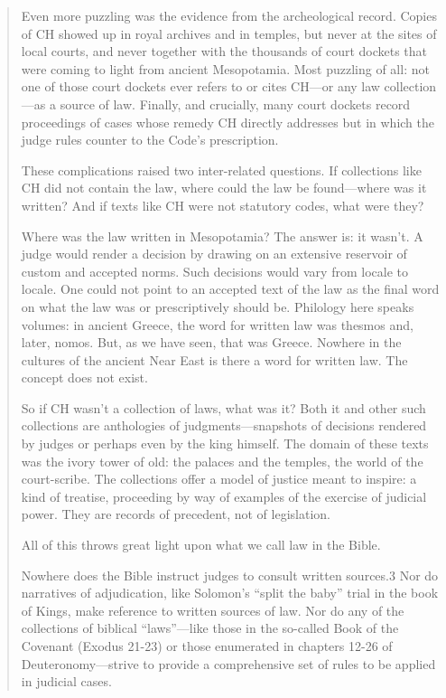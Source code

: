 \documentclass[11pt]{article}
\begin{document}
\begin{quote}
Even more puzzling was the evidence from the archeological record. Copies of CH showed up in royal archives and in temples, but never at the sites of local courts, and never together with the thousands of court dockets that were coming to light from ancient Mesopotamia. Most puzzling of all: not one of those court dockets ever refers to or cites CH—or any law collection—as a source of law. Finally, and crucially, many court dockets record proceedings of cases whose remedy CH directly addresses but in which the judge rules counter to the Code’s prescription.

These complications raised two inter-related questions. If collections like CH did not contain the law, where could the law be found—where was it written? And if texts like CH were not statutory codes, what were they?

Where was the law written in Mesopotamia? The answer is: it wasn’t. A judge would render a decision by drawing on an extensive reservoir of custom and accepted norms. Such decisions would vary from locale to locale. One could not point to an accepted text of the law as the final word on what the law was or prescriptively should be. Philology here speaks volumes: in ancient Greece, the word for written law was thesmos and, later, nomos. But, as we have seen, that was Greece. Nowhere in the cultures of the ancient Near East is there a word for written law. The concept does not exist. 

So if CH wasn’t a collection of laws, what was it? Both it and other such collections are anthologies of judgments—snapshots of decisions rendered by judges or perhaps even by the king himself. The domain of these texts was the ivory tower of old: the palaces and the temples, the world of the court-scribe. The collections offer a model of justice meant to inspire: a kind of treatise, proceeding by way of examples of the exercise of judicial power. They are records of precedent, not of legislation.


All of this throws great light upon what we call law in the Bible.

Nowhere does the Bible instruct judges to consult written sources.3 Nor do narratives of adjudication, like Solomon’s “split the baby” trial in the book of Kings, make reference to written sources of law. Nor do any of the collections of biblical “laws”—like those in the so-called Book of the Covenant (Exodus 21-23) or those enumerated in chapters 12-26 of Deuteronomy—strive to provide a comprehensive set of rules to be applied in judicial cases.



\end{quote}
\end{document}
